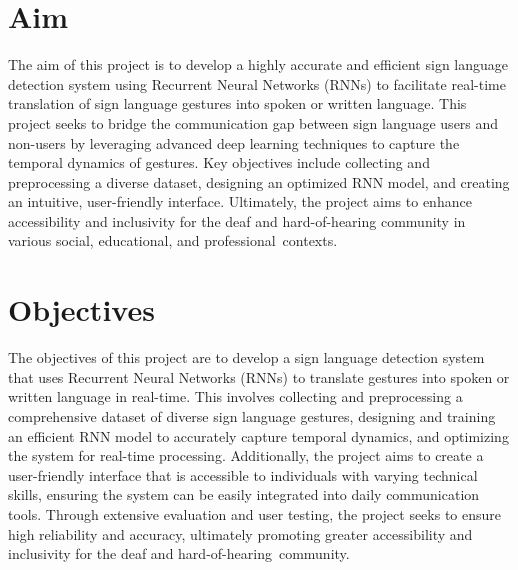 \section{Aim}
The aim of this project is to develop a highly accurate and efficient sign language detection system using Recurrent Neural Networks (RNNs) to facilitate real-time translation of sign language gestures into spoken or written language. This project seeks to bridge the communication gap between sign language users and non-users by leveraging advanced deep learning techniques to capture the temporal dynamics of gestures. Key objectives include collecting and preprocessing a diverse dataset, designing an optimized RNN model, and creating an intuitive, user-friendly interface. Ultimately, the project aims to enhance accessibility and inclusivity for the deaf and hard-of-hearing community in various social, educational, and professional contexts.

\section{Objectives}
The objectives of this project are to develop a sign language detection system that uses Recurrent Neural Networks (RNNs) to translate gestures into spoken or written language in real-time. This involves collecting and preprocessing a comprehensive dataset of diverse sign language gestures, designing and training an efficient RNN model to accurately capture temporal dynamics, and optimizing the system for real-time processing. Additionally, the project aims to create a user-friendly interface that is accessible to individuals with varying technical skills, ensuring the system can be easily integrated into daily communication tools. Through extensive evaluation and user testing, the project seeks to ensure high reliability and accuracy, ultimately promoting greater accessibility and inclusivity for the deaf and hard-of-hearing community.

